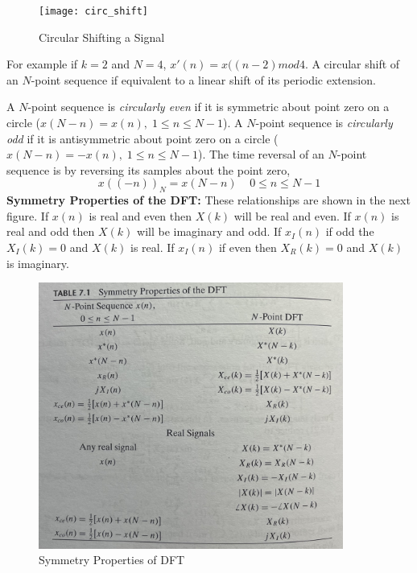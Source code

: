 \documentclass{article} %
\begin{document}
	\begin{figure}[h]
	\centering
	\texttt{[image: circ\_shift]}
	\caption{Circular Shifting a Signal}
	\end{figure}
	
	For example if $k = 2$ and $N = 4$, $x'(n) = x((n-2) mod 4$. A circular shift of an $N$-point sequence if equivalent to a linear shift of its periodic extension. 
	
	A $N$-point sequence is \textit{circularly even} if it is symmetric about point zero on a circle ($x(N-n) = x(n), \; 1 \le n \le N-1$). A $N$-point sequence is \textit{circularly odd} if it is antisymmetric about point zero on a circle ($x(N-n) = -x(n), \; 1 \le n \le N-1$). The time reversal of an $N$-point sequence is by reversing its samples about the point zero,
	\begin{equation}
	x((-n))_N = x(N-n) \;\;\;\; 0 \le n \le N-1
	\end{equation}
	\textbf{Symmetry Properties of the DFT:} These relationships are shown in the next figure. If $x(n)$ is real and even then $X(k)$ will be real and even. If $x(n)$ is real and odd then $X(k)$ will be imaginary and odd. If $x_I(n)$ if odd the $X_I(k) = 0$ and $X(k)$ is real. If $x_I(n)$ if even then $X_R(k) = 0$ and $X(k)$ is imaginary. 
	
	\begin{figure}[h]
	\centering
	\includegraphics[width=10cm]{symm_dft}
	\caption{Symmetry Properties of DFT}
	\end{figure}
	
\end{document}
